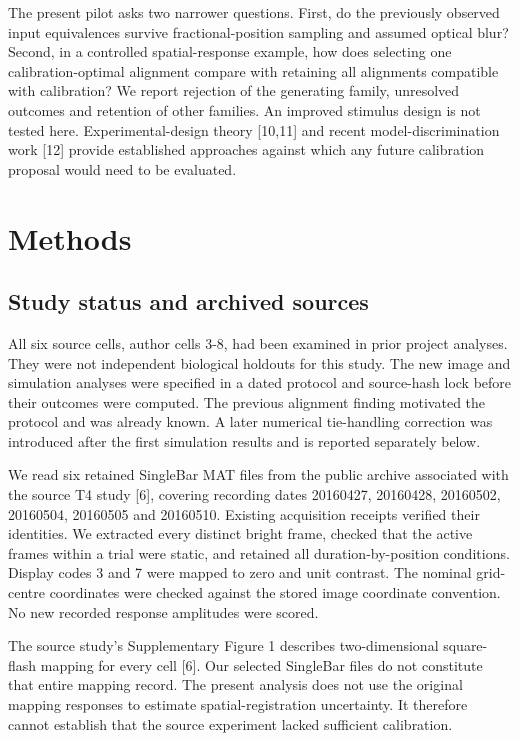 \documentclass[11pt,letterpaper]{article}
\begin{document}
The present pilot asks two narrower questions. First, do the previously observed input equivalences survive fractional-position sampling and assumed optical blur? Second, in a controlled spatial-response example, how does selecting one calibration-optimal alignment compare with retaining all alignments compatible with calibration? We report rejection of the generating family, unresolved outcomes and retention of other families. An improved stimulus design is not tested here. Experimental-design theory [10,11] and recent model-discrimination work [12] provide established approaches against which any future calibration proposal would need to be evaluated.


\section{Methods}

\subsection{Study status and archived sources}

All six source cells, author cells 3-8, had been examined in prior project analyses. They were not independent biological holdouts for this study. The new image and simulation analyses were specified in a dated protocol and source-hash lock before their outcomes were computed. The previous alignment finding motivated the protocol and was already known. A later numerical tie-handling correction was introduced after the first simulation results and is reported separately below.


We read six retained SingleBar MAT files from the public archive associated with the source T4 study [6], covering recording dates 20160427, 20160428, 20160502, 20160504, 20160505 and 20160510. Existing acquisition receipts verified their identities. We extracted every distinct bright frame, checked that the active frames within a trial were static, and retained all duration-by-position conditions. Display codes 3 and 7 were mapped to zero and unit contrast. The nominal grid-centre coordinates were checked against the stored image coordinate convention. No new recorded response amplitudes were scored.


The source study's Supplementary Figure 1 describes two-dimensional square-flash mapping for every cell [6]. Our selected SingleBar files do not constitute that entire mapping record. The present analysis does not use the original mapping responses to estimate spatial-registration uncertainty. It therefore cannot establish that the source experiment lacked sufficient calibration.
\end{document}
